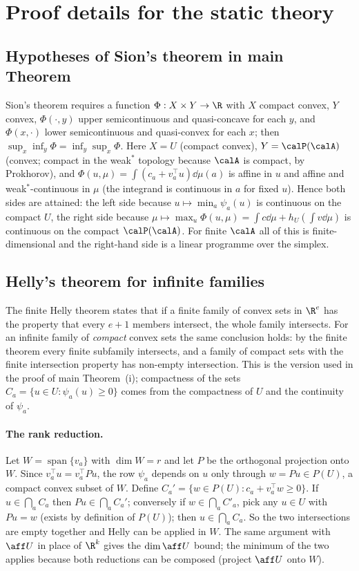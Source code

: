 \section{Proof details for the static theory}\label{si:proofs}

\subsection{Hypotheses of Sion's theorem in main Theorem~}
Sion's theorem requires a function $\Phi:X\times Y\to\R$ with $X$ compact convex, $Y$ convex, $\Phi(\cdot,y)$ upper semicontinuous and quasi-concave for each $y$, and $\Phi(x,\cdot)$ lower semicontinuous and quasi-convex for each $x$; then $\sup_x\inf_y\Phi=\inf_y\sup_x\Phi$. Here $X=U$ (compact convex), $Y=\calP(\calA)$ (convex; compact in the weak$^\ast$ topology because $\calA$ is compact, by Prokhorov), and $\Phi(u,\mu)=\int(c_a+v_a^\top u)\dd\mu(a)$ is affine in $u$ and affine and weak$^\ast$-continuous in $\mu$ (the integrand is continuous in $a$ for fixed $u$). Hence both sides are attained: the left side because $u\mapsto\min_a\psi_a(u)$ is continuous on the compact $U$, the right side because $\mu\mapsto\max_u\Phi(u,\mu)=\int c\dd\mu+h_U(\int v\dd\mu)$ is continuous on the compact $\calP(\calA)$. For finite $\calA$ all of this is finite-dimensional and the right-hand side is a linear programme over the simplex.

\subsection{Helly's theorem for infinite families}
The finite Helly theorem states that if a finite family of convex sets in $\R^e$ has the property that every $e+1$ members intersect, the whole family intersects. For an infinite family of \emph{compact} convex sets the same conclusion holds: by the finite theorem every finite subfamily intersects, and a family of compact sets with the finite intersection property has non-empty intersection. This is the version used in the proof of main Theorem~(i); compactness of the sets $C_a=\{u\in U:\psi_a(u)\ge0\}$ comes from the compactness of $U$ and the continuity of $\psi_a$.

\paragraph{The rank reduction.} Let $W=\operatorname{span}\{v_a\}$ with $\dim W=r$ and let $P$ be the orthogonal projection onto $W$. Since $v_a^\top u=v_a^\top Pu$, the row $\psi_a$ depends on $u$ only through $w=Pu\in P(U)$, a compact convex subset of $W$. Define $C_a'=\{w\in P(U):c_a+v_a^\top w\ge0\}$. If $u\in\bigcap_aC_a$ then $Pu\in\bigcap_aC_a'$; conversely if $w\in\bigcap_aC'_a$, pick any $u\in U$ with $Pu=w$ (exists by definition of $P(U)$); then $u\in\bigcap_aC_a$. So the two intersections are empty together and Helly can be applied in $W$. The same argument with $\aff U$ in place of $\R^k$ gives the $\dim\aff U$ bound; the minimum of the two applies because both reductions can be composed (project $\aff U$ onto $W$).

